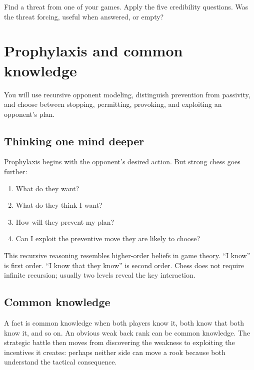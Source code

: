 \begin{exercise}
Find a threat from one of your games. Apply the five credibility questions. Was the threat forcing, useful when answered, or empty?
\end{exercise}


\chapter{Prophylaxis and common knowledge}
\begin{learningbox}
You will use recursive opponent modeling, distinguish prevention from passivity, and choose between stopping, permitting, provoking, and exploiting an opponent's plan.
\end{learningbox}

\section{Thinking one mind deeper}
Prophylaxis begins with the opponent's desired action. But strong chess goes further:

\begin{enumerate}[leftmargin=1.4em]
\item What do they want?
\item What do they think I want?
\item How will they prevent my plan?
\item Can I exploit the preventive move they are likely to choose?
\end{enumerate}

This recursive reasoning resembles higher-order beliefs in game theory. ``I know'' is first order. ``I know that they know'' is second order. Chess does not require infinite recursion; usually two levels reveal the key interaction.

\section{Common knowledge}
A fact is common knowledge when both players know it, both know that both know it, and so on. An obvious weak back rank can be common knowledge. The strategic battle then moves from discovering the weakness to exploiting the incentives it creates: perhaps neither side can move a rook because both understand the tactical consequence.

